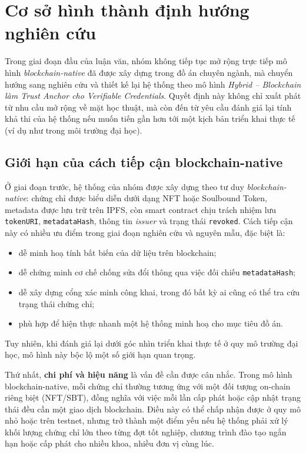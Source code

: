 \chapter{Cơ sở hình thành định hướng nghiên cứu}

Trong giai đoạn đầu của luận văn, nhóm không tiếp tục mở rộng trực tiếp mô hình \textit{blockchain-native} đã được xây dựng trong đồ án chuyên ngành, mà chuyển hướng sang nghiên cứu và thiết kế lại hệ thống theo mô hình \textit{Hybrid -- Blockchain làm Trust Anchor cho Verifiable Credentials}. Quyết định này không chỉ xuất phát từ nhu cầu mở rộng về mặt học thuật, mà còn đến từ yêu cầu đánh giá lại tính khả thi của hệ thống nếu muốn tiến gần hơn tới một kịch bản triển khai thực tế (ví dụ như trong môi trường đại học). \cite{nakamoto2008bitcoin}

\section{Giới hạn của cách tiếp cận blockchain-native}

Ở giai đoạn trước, hệ thống của nhóm được xây dựng theo tư duy \textit{blockchain-native}: chứng chỉ được biểu diễn dưới dạng NFT hoặc Soulbound Token, metadata được lưu trữ trên IPFS, còn smart contract chịu trách nhiệm lưu \texttt{tokenURI}, \texttt{metadataHash}, thông tin \textit{issuer} và trạng thái \texttt{revoked}. Cách tiếp cận này có nhiều ưu điểm trong giai đoạn nghiên cứu và nguyên mẫu, đặc biệt là:
\begin{itemize}
    \item dễ minh hoạ tính bất biến của dữ liệu trên blockchain;
    \item dễ chứng minh cơ chế chống sửa đổi thông qua việc đối chiếu \texttt{metadataHash};
    \item dễ xây dựng cổng xác minh công khai, trong đó bất kỳ ai cũng có thể tra cứu trạng thái chứng chỉ;
    \item phù hợp để hiện thực nhanh một hệ thống minh hoạ cho mục tiêu đồ án.
\end{itemize}

Tuy nhiên, khi đánh giá lại dưới góc nhìn triển khai thực tế ở quy mô trường đại học, mô hình này bộc lộ một số giới hạn quan trọng.

Thứ nhất, \textbf{chi phí và hiệu năng} là vấn đề cần được cân nhắc. Trong mô hình blockchain-native, mỗi chứng chỉ thường tương ứng với một đối tượng on-chain riêng biệt (NFT/SBT), đồng nghĩa với việc mỗi lần cấp phát hoặc cập nhật trạng thái đều cần một giao dịch blockchain. Điều này có thể chấp nhận được ở quy mô nhỏ hoặc trên testnet, nhưng trở thành một điểm yếu nếu hệ thống phải xử lý khối lượng chứng chỉ lớn theo từng đợt tốt nghiệp, chương trình đào tạo ngắn hạn hoặc cấp phát cho nhiều khoa, nhiều đơn vị cùng lúc.

